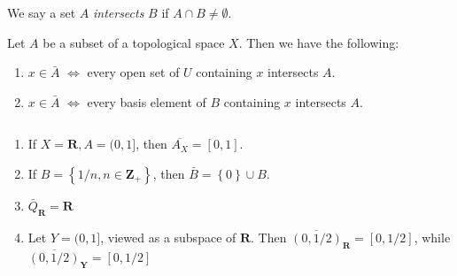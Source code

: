 \begin{definition}
	\label{def:intersects}
	We say a set $A$ \emph{intersects} $B$ if $A \cap B \neq \emptyset$.
\end{definition}
\begin{theorem}
	\label{thm:closure-intersect-equivs}
	Let $A$ be a subset of a topological space $X$. Then we have the following:
	\begin{enumerate}
		\item $x \in \bar{A}$ $\iff$  every open set of $U$ containing
			$x$ intersects $A$.
		\item $x \in \bar{A}$ $\iff$ every basis element of $B$ containing
			$x$ intersects $A$.
	\end{enumerate}
\end{theorem}
\begin{example} $ $
	\begin{enumerate}
		\item If $X = \mathbf{R}, A = (0,1]$, then $\overline{A_{X}} = [0,1]$.
		\item If $B = \left\{ 1/n, n \in \mathbf{Z}_{+} \right\}$, then
			$\bar{B} = \left\{ 0 \right\} \cup B$.
		\item $\bar{Q}_{\mathbf{R}} = \mathbf{R}$
		\item Let $Y = (0,1]$, viewed as a subspace of $\mathbf{R}$. Then
			$\overline{(0,1/2)}_{\mathbf{R}} = [0,1/2]$, while
			$\overline{(0,1/2)}_{\mathbf{Y}} = [0,1/2]$
	\end{enumerate}
\end{example}

